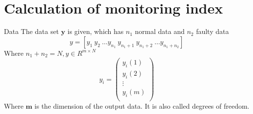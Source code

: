 \documentclass[10pt]{beamer}
\begin{document}
\section{Calculation of monitoring index}
\begin{frame}{Data}
The data set $\textbf{y}$ is given, which has $n_1$ normal data and $n_2$
faulty data
\begin{equation}
   y = [y_1 \ y_2 \ \dots y_{n_1} \ y_{n_1+1} \ y_{n_1+2} \ \dots y_{n_1+n_2}] 
\end{equation}
Where $n_1 + n_2 = N, y \in R^{m\times N}$
\begin{equation}
    y_i = 
    \begin{pmatrix}
        y_i(1) \\
        y_i(2) \\
       \vdots  \\
        y_i(m) \\ 
    \end{pmatrix}
\end{equation}
Where $\textbf{m}$ is the dimension of the output data. It is also called  degrees of freedom. %
\end{frame}
\end{document}
